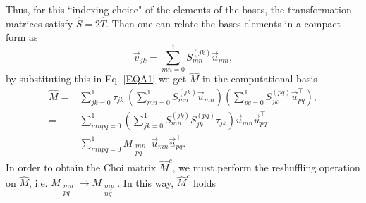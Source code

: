 % 
Thus, for this ``indexing choice" of the elements of the bases, the transformation matrices satisfy $\hat{S}=2\hat{T}$. Then one can relate the bases elements in a compact form as
% 
\begin{equation}
 \vec{v}_{jk}=\sum_{mn=0}^1S_{mn}^{(jk)}\vec{u}_{mn},
\end{equation}
% 
by substituting this in Eq. \ref{EQA1} we get $\hat{M}$ in the computational basis
% 
\begin{align}
 \hat{M}=&\sum_{jk=0}^1\tau_{jk}~\left(\sum_{mn=0}^1S_{mn}^{(jk)}\vec{u}_{mn} \right) \left(\sum_{pq=0}^1S_{jk}^{(pq)}\vec{u}^\intercal_{pq} \right),\\
 =&\sum_{mnpq=0}^1\left(\sum_{jk=0}^1 S_{mn}^{(jk)}S_{jk}^{(pq)}  \tau_{jk} \right) \vec{u}_{mn}\vec{u}^\intercal_{pq}.\\
 &\sum_{mnpq=0}^1 M_{\substack{mn\\pq}} ~\vec{u}_{mn}\vec{u}^\intercal_{pq}.
\end{align}
% 
In order to obtain the Choi matrix $\hat{M}^c$, we must perform the reshuffling operation on $\hat{M}$, i.e. $M_{\substack{mn\\pq}} \to M_{\substack{mp\\nq}}$. In this way, $\hat{M}^c$ holds

